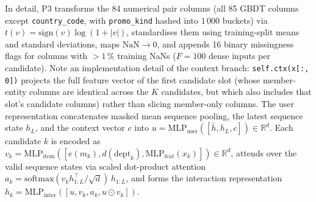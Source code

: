 \documentclass{ieeeaccess}
\begin{document}
In detail, P3 transforms the 84 numerical pair columns (all 85 GBDT columns except \texttt{country\_code}, with \texttt{promo\_kind} hashed into $1\,000$ buckets) via $t(v) = \mathrm{sign}(v)\log(1+|v|)$, standardises them using training-split means and standard deviations, maps $\mathrm{NaN} \to 0$, and appends 16 binary missingness flags for columns with $>1\,\%$ training NaNs ($F=100$ dense inputs per candidate). Note an implementation detail of the context branch: \texttt{self.ctx(x[:, 0])} projects the full feature vector of the first candidate slot (whose member-entity columns are identical across the $K$ candidates, but which also includes that slot's candidate columns) rather than slicing member-only columns. The user representation concatenates masked mean sequence pooling, the latest sequence state $h_{L}$, and the context vector $c$ into $u = \mathrm{MLP}_{\mathrm{user}}([\bar{h}, h_L, c]) \in \mathbb{R}^d$. Each candidate $k$ is encoded as $v_k = \mathrm{MLP}_{\mathrm{item}}([e(m_k), d(\mathrm{dept}_k), \mathrm{MLP}_{\mathrm{feat}}(x_k)]) \in \mathbb{R}^d$, attends over the valid sequence states via scaled dot-product attention $a_k = \mathrm{softmax}(v_k h_{1:L}^\top / \sqrt{d})\,h_{1:L}$, and forms the interaction representation $h_k = \mathrm{MLP}_{\mathrm{inter}}([u, v_k, a_k, u \odot v_k])$.
\end{document}
